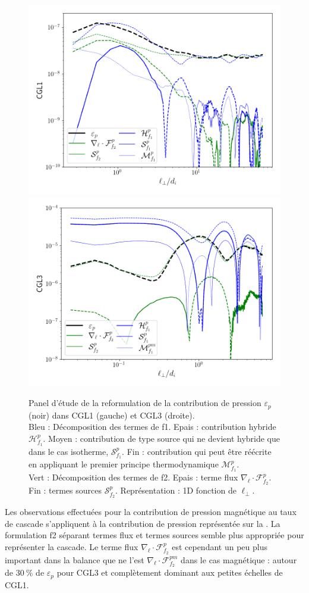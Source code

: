 \begin{figure}[!ht]
 \centering
 \includegraphics[width=0.49\linewidth,trim=1cm 1cm 1cm 1cm, clip=true]{./Part_3/images_ch2/CGL1_f2p_1D_lperp}
\hfill
\includegraphics[width=0.49\linewidth,trim=1cm 1cm 1cm 1cm, clip=true]{./Part_3/images_ch2/CGL3_f2p_1D_lperp}
\cprotect\caption{Panel d'étude de la reformulation de la contribution de pression $\varepsilon_{p}$ (noir) dans CGL1 (gauche) et CGL3 (droite). \\Bleu : Décomposition des termes de f1. Epais : contribution hybride $\mathcal{H}^{p}_{f_1}$. Moyen : contribution de type source qui ne devient hybride que dans le cas isotherme, $\mathcal{S}^{p}_{f_1}$. Fin :  contribution qui peut être réécrite en appliquant le premier principe thermodynamique $\mathcal{M}^{p}_{f_1}$.\\Vert : Décomposition des termes de f2. Epais : terme flux $\nabla_{\boldsymbol{\ell}} \cdot \mathcal{F}^{p}_{f_2}$. Fin : termes sources $\mathcal{S}^{p}_{f_2}$. Représentation : 1D fonction de $\ell_{\perp}$.}
\label{fig:elf2p}
\end{figure}
Les observations effectuées pour la contribution de pression magnétique au taux de cascade s'appliquent à la contribution de pression représentée sur la  . La formulation f2 séparant termes flux et termes sources semble plus appropriée pour représenter la cascade. Le terme flux $\nabla_{\boldsymbol{\ell}} \cdot \mathcal{F}^{p}_{f_2}$ est cependant un peu plus important dans la balance que ne l'est $\nabla_{\boldsymbol{\ell}} \cdot \mathcal{F}^{pm}_{f_2}$ dans le cas magnétique : autour de $\SI{30}{\%}$ de $\varepsilon_{p}$ pour CGL3 et complètement dominant aux petites échelles de CGL1. 

